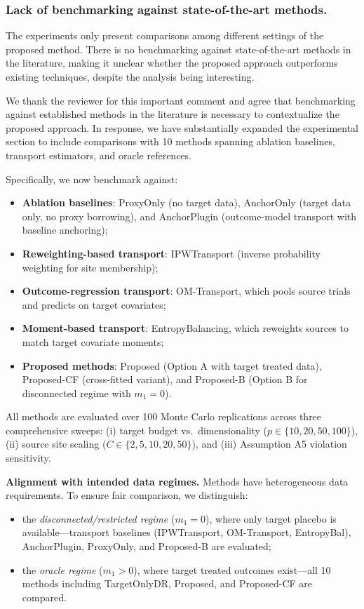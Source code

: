 \subsubsection{Lack of benchmarking against state-of-the-art methods.}  
The experiments only present comparisons among different settings of the proposed method. There is no benchmarking against state-of-the-art methods in the literature, making it unclear whether the proposed approach outperforms existing techniques, despite the analysis being interesting.

{\color{blue}
We thank the reviewer for this important comment and agree that benchmarking against established methods in the literature is necessary to contextualize the proposed approach. In response, we have substantially expanded the experimental section to include comparisons with 10 methods spanning ablation baselines, transport estimators, and oracle references.

Specifically, we now benchmark against:
\begin{itemize}
\item \textbf{Ablation baselines}: ProxyOnly (no target data), AnchorOnly (target data only, no proxy borrowing), and AnchorPlugin (outcome-model transport with baseline anchoring);
\item \textbf{Reweighting-based transport}: IPWTransport (inverse probability weighting for site membership);
\item \textbf{Outcome-regression transport}: OM-Transport, which pools source trials and predicts on target covariates;
\item \textbf{Moment-based transport}: EntropyBalancing, which reweights sources to match target covariate moments;
\item \textbf{Proposed methods}: Proposed (Option A with target treated data), Proposed-CF (cross-fitted variant), and Proposed-B (Option B for disconnected regime with $m_1 = 0$).
\end{itemize}

All methods are evaluated over 100 Monte Carlo replications across three comprehensive sweeps: (i) target budget vs.\ dimensionality ($p \in \{10, 20, 50, 100\}$), (ii) source site scaling ($C \in \{2, 5, 10, 20, 50\}$), and (iii) Assumption A5 violation sensitivity.

\medskip
\noindent
\textbf{Alignment with intended data regimes.}
Methods have heterogeneous data requirements. To ensure fair comparison, we distinguish:
\begin{itemize}
\item the \emph{disconnected/restricted regime} ($m_1=0$), where only target placebo is available---transport baselines (IPWTransport, OM-Transport, EntropyBal), AnchorPlugin, ProxyOnly, and Proposed-B are evaluated;
\item the \emph{oracle regime} ($m_1>0$), where target treated outcomes exist---all 10 methods including TargetOnlyDR, Proposed, and Proposed-CF are compared.
\end{itemize}

}
